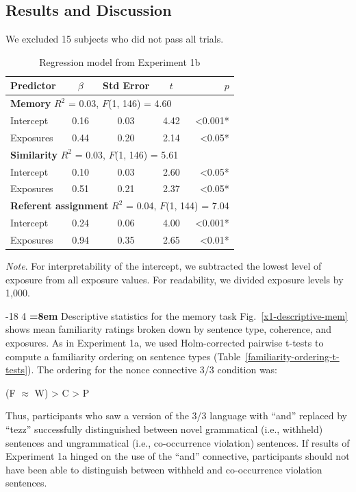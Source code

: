 \documentclass[man,longtable, floatmark]{my-apa6}
\makeatletter
\renewcommand\subsubsection{\@startsection{subsubsection}{3}{\z@}%
                       {-18\p@ \@plus -4\p@ \@minus -4\p@}%
                       {4\p@ \@plus 2\p@ \@minus 2\p@}%
                       {\normalfont\normalsize\bfseries\boldmath
                        \rightskip=\z@ \@plus 8em\pretolerance=10000 }}
\makeatother
\begin{document}
\subsection{Results and Discussion}
We excluded 15 subjects who did not pass all trials.

\begin{table}[t]
  \caption{Regression model from Experiment 1b}
  \label{fig:expt1b-regression}
  \begin{threeparttable}
    \begin{tabular}{l c c c r}
      \hline
      Predictor & $\beta$ & Std Error & $t$ & $p$ \\
      \hline
      \multicolumn{5}{l}{\small{\textbf{Memory} $R^2$ = 0.03, $F$(1, 146) = 4.60}}\\
      Intercept & 0.16 & 0.03 & 4.42 & <0.001*\\
      Exposures & 0.44 & 0.20 & 2.14 & <0.05* \\
      \hline
      \multicolumn{5}{l}{\small{\textbf{Similarity} $R^2$ = 0.03, $F$(1, 146) = 5.61}}\\
      Intercept & 0.10 & 0.03 & 2.60 & <0.05*\\
      Exposures & 0.51 & 0.21 & 2.37 & <0.05* \\
      \hline
      \multicolumn{5}{l}{\small{\textbf{Referent assignment} $R^2$ = 0.04, $F$(1, 144) = 7.04}}\\
      Intercept & 0.24 & 0.06 & 4.00 & <0.001*\\
      Exposures & 0.94 & 0.35 & 2.65 & <0.01* \\
      \hline
    \end{tabular}
    \begin{tablenotes}
    \item \footnotesize{\emph{Note}. For interpretability of the intercept, we subtracted the lowest level of exposure from all exposure values. For readability, we divided exposure levels by 1,000.}
    \end{tablenotes}
  \end{threeparttable}
\end{table}

\subsubsection{Descriptive statistics for the memory task}
Fig.~\ref{x1-descriptive-mem} shows mean familiarity ratings broken down by sentence type, coherence, and exposures. As in Experiment 1a, we used Holm-corrected pairwise t-tests to compute a familiarity ordering on sentence types (Table~\ref{familiarity-ordering-t-tests}). The ordering for the nonce connective 3/3 condition was:
\begin{center}
  (F $\approx$ W) > C > P
\end{center}
\noindent Thus, participants who saw a version of the 3/3 language with ``and'' replaced by ``tezz'' successfully distinguished between novel grammatical (i.e., withheld) sentences and ungrammatical (i.e., co-occurrence violation) sentences. If results of Experiment 1a hinged on the use of the ``and'' connective, participants should not have been able to distinguish between withheld and co-occurrence violation sentences.
\end{document}
